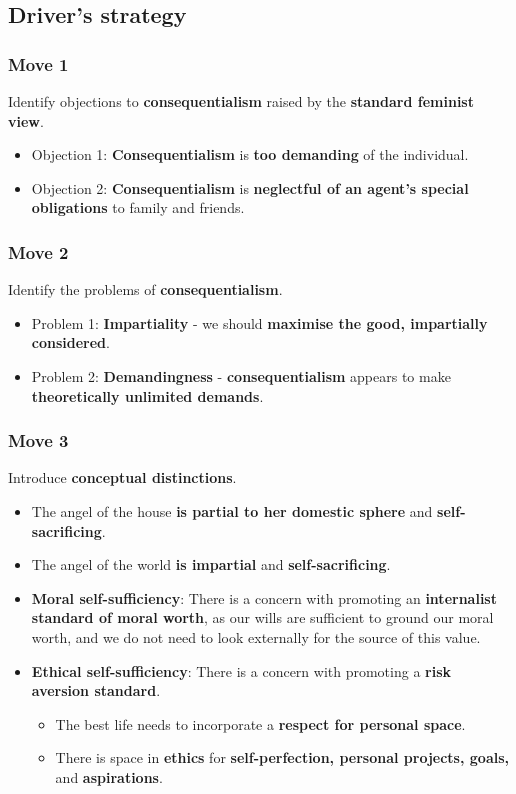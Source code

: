 \documentclass[11pt]{article}
\begin{document}
 \newpage
\subsection{Driver's strategy}
\label{sec:orgead269e}

\subsubsection{Move 1}
\label{sec:org5643685}
Identify objections to \textbf{consequentialism} raised by the \textbf{standard feminist view}.
\begin{itemize}
\item Objection 1: \textbf{Consequentialism} is \textbf{too demanding} of the individual.
\item Objection 2: \textbf{Consequentialism} is \textbf{neglectful of an agent's special obligations} to family and friends.
\end{itemize}
\subsubsection{Move 2}
\label{sec:org3bdb2ab}
Identify the problems of \textbf{consequentialism}.
\begin{itemize}
\item Problem 1: \textbf{Impartiality} - we should \textbf{maximise the good, impartially considered}.
\item Problem 2: \textbf{Demandingness} - \textbf{consequentialism} appears to make \textbf{theoretically unlimited demands}.
\end{itemize}
\subsubsection{Move 3}
\label{sec:org2808d48}
Introduce \textbf{conceptual distinctions}.
\begin{itemize}
\item The angel of the house \textbf{is partial to her domestic sphere} and \textbf{self-sacrificing}.
\item The angel of the world \textbf{is impartial} and \textbf{self-sacrificing}.
\item \textbf{Moral self-sufficiency}: There is a concern with promoting an \textbf{internalist standard of moral worth}, as our wills are sufficient to ground our moral worth, and we do not need to look externally for the source of this value.
\item \textbf{Ethical self-sufficiency}: There is a concern with promoting a \textbf{risk aversion standard}.
\begin{itemize}
\item The best life needs to incorporate a \textbf{respect for personal space}.
\item There is space in \textbf{ethics} for \textbf{self-perfection, personal projects, goals,} and \textbf{aspirations}.
\end{itemize}
\end{itemize}
\end{document}
